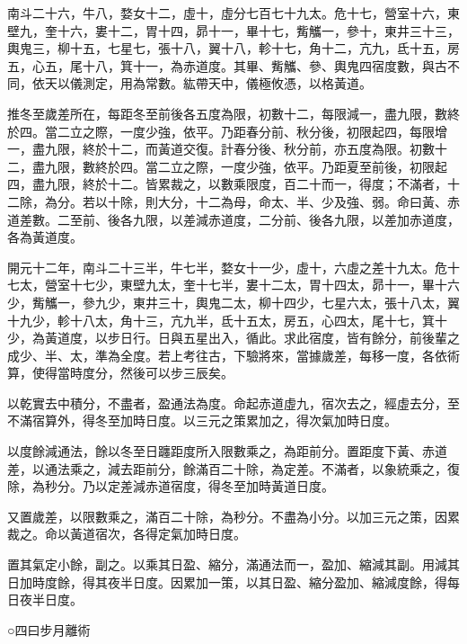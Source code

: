\begin{pinyinscope}
 南斗二十六，牛八，婺女十二，虛十，虛分七百七十九太。危十七，營室十六，東壁九，奎十六，婁十二，胃十四，昴十一，畢十七，觜觿一，參十，東井三十三，輿鬼三，柳十五，七星七，張十八，翼十八，軫十七，角十二，亢九，氐十五，房五，心五，尾十八，箕十一，為赤道度。其畢、觜觿、參、輿鬼四宿度數，與古不同，依天以儀測定，用為常數。紘帶天中，儀極攸憑，以格黃道。



 推冬至歲差所在，每距冬至前後各五度為限，初數十二，每限減一，盡九限，數終於四。當二立之際，一度少強，依平。乃距春分前、秋分後，初限起四，每限增一，盡九限，終於十二，而黃道交復。計春分後、秋分前，亦五度為限。初數十二，盡九限，數終於四。當二立之際，一度少強，依平。乃距夏至前後，初限起四，盡九限，終於十二。皆累裁之，以數乘限度，百二十而一，得度；不滿者，十二除，為分。若以十除，則大分，十二為母，命太、半、少及強、弱。命曰黃、赤道差數。二至前、後各九限，以差減赤道度，二分前、後各九限，以差加赤道度，各為黃道度。



 開元十二年，南斗二十三半，牛七半，婺女十一少，虛十，六虛之差十九太。危十七太，營室十七少，東壁九太，奎十七半，婁十二太，胃十四太，昴十一，畢十六少，觜觿一，參九少，東井三十，輿鬼二太，柳十四少，七星六太，張十八太，翼十九少，軫十八太，角十三，亢九半，氐十五太，房五，心四太，尾十七，箕十少，為黃道度，以步日行。日與五星出入，循此。求此宿度，皆有餘分，前後輩之成少、半、太，準為全度。若上考往古，下驗將來，當據歲差，每移一度，各依術算，使得當時度分，然後可以步三辰矣。



 以乾實去中積分，不盡者，盈通法為度。命起赤道虛九，宿次去之，經虛去分，至不滿宿算外，得冬至加時日度。以三元之策累加之，得次氣加時日度。



 以度餘減通法，餘以冬至日躔距度所入限數乘之，為距前分。置距度下黃、赤道差，以通法乘之，減去距前分，餘滿百二十除，為定差。不滿者，以象統乘之，復除，為秒分。乃以定差減赤道宿度，得冬至加時黃道日度。



 又置歲差，以限數乘之，滿百二十除，為秒分。不盡為小分。以加三元之策，因累裁之。命以黃道宿次，各得定氣加時日度。



 置其氣定小餘，副之。以乘其日盈、縮分，滿通法而一，盈加、縮減其副。用減其日加時度餘，得其夜半日度。因累加一策，以其日盈、縮分盈加、縮減度餘，得每日夜半日度。



 ○四曰步月離術




\end{pinyinscope}
